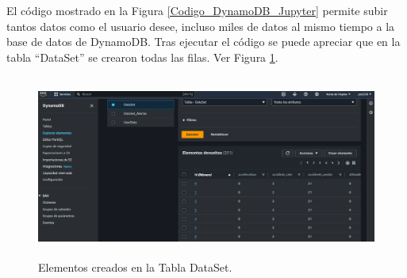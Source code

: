 \documentclass[a4paper,10pt, oneside, titlepage]{article}
\begin{document}
	\indent El código mostrado en la Figura \ref{Codigo_DynamoDB_Jupyter} permite subir tantos datos como el usuario desee, incluso miles de datos al mismo tiempo a la base de datos de DynamoDB. Tras ejecutar el código se puede apreciar que en la tabla ``DataSet'' se crearon todas las filas. Ver Figura \ref{DyanmoDB_DataSet}.
	\begin{figure}[!h]
		\centering
		\includegraphics[width = 1\linewidth, height = 6cm]{DyanmoDB_DataSet.png}
		\caption{Elementos creados en la Tabla DataSet.}
		\label{DyanmoDB_DataSet}
	\end{figure}
	
\end{document}
